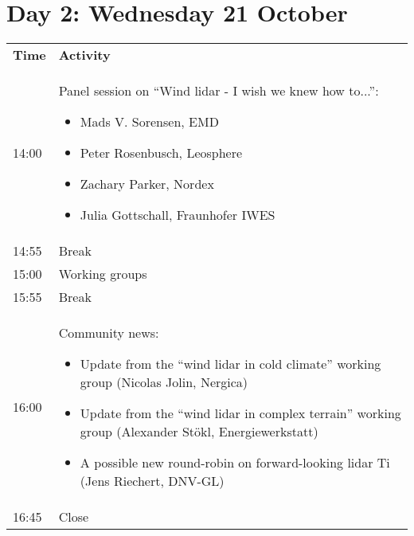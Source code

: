\section{Day 2: Wednesday 21 October}

\begin{table}[!h]
    \centering
    \begin{tabular}{@{}|p{}|p{}|@{}}
    \rowcolor{Task32Blue2} \textbf{Time} & \textbf{Activity} \\
    14:00 & Panel session on “Wind lidar - I wish we knew how to...”:
        \begin{itemize}
            \item Mads V. Sorensen, EMD
            \item Peter Rosenbusch, Leosphere
            \item  Zachary Parker, Nordex
            \item Julia Gottschall, Fraunhofer IWES
        \end{itemize} \\
    14:55 & Break \\
    15:00 & Working groups \\
    15:55 & Break \\
    16:00 & Community news: 
        \begin{itemize}
            \item Update from the “wind lidar in cold climate” working group (Nicolas Jolin, Nergica)
            \item Update from the “wind lidar in complex terrain” working group (Alexander Stökl, Energiewerkstatt)
            \item A possible new round-robin on forward-looking lidar Ti (Jens Riechert, DNV-GL)
        \end{itemize}\\
    16:45 & Close
    \end{tabular}
    \label{tab:day2-agenda}
\end{table}